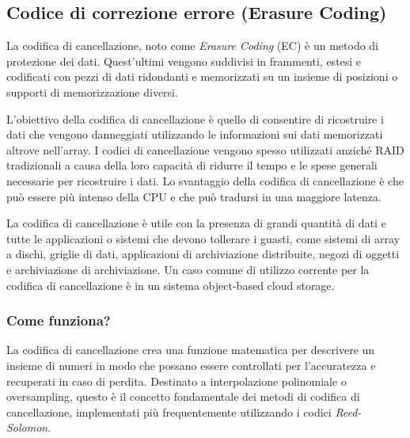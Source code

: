 \item
\subsection{Codice di correzione errore (Erasure Coding)}
La codifica di cancellazione, noto come \emph{Erasure Coding} (EC) \`{e} un metodo di protezione dei dati. Quest'ultimi vengono suddivisi in frammenti, estesi e codificati con pezzi di dati ridondanti e memorizzati su un insieme di posizioni o supporti di memorizzazione diversi.\cite{etichetta11}

L'obiettivo della codifica di cancellazione \`{e} quello di consentire di ricostruire i dati che vengono danneggiati utilizzando le informazioni sui dati memorizzati altrove nell'array. I codici di cancellazione vengono spesso utilizzati anzich\'{e} RAID tradizionali a causa della loro capacit\`{a} di ridurre il tempo e le spese generali necessarie per ricostruire i dati. Lo svantaggio della codifica di cancellazione \`{e} che pu\`{o} essere pi\`{u} intenso della CPU e che pu\`{o} tradursi in una maggiore latenza.\cite{etichetta11}

La codifica di cancellazione \`{e} utile con la presenza di grandi quantit\`{a} di dati e tutte le applicazioni o sistemi che devono tollerare i guasti, come sistemi di array a dischi, griglie di dati, applicazioni di archiviazione distribuite, negozi di oggetti e archiviazione di archiviazione. Un caso comune di utilizzo corrente per la codifica di cancellazione \`{e} in un sistema object-based cloud storage\cite{etichetta11}.

\subsubsection{Come funziona?}
La codifica di cancellazione crea una funzione matematica per descrivere un insieme di numeri in modo che possano essere controllati per l'accuratezza e recuperati in caso di perdita. Destinato a interpolazione polinomiale o oversampling, questo \`{e} il concetto fondamentale dei metodi di codifica di cancellazione, implementati pi\`{u} frequentemente utilizzando i codici \textit{Reed-Solomon}\cite{etichetta11}. 

